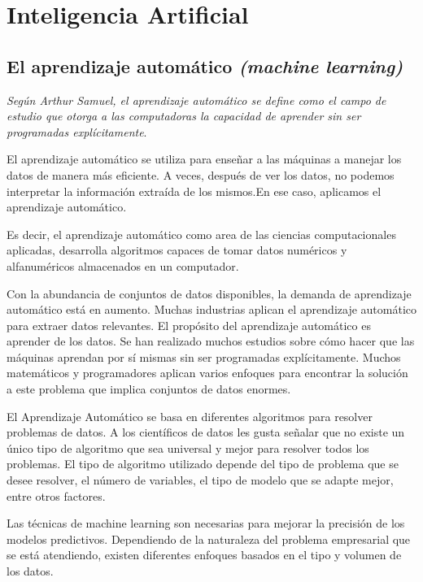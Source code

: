 \section{Inteligencia Artificial}
\subsection{El aprendizaje automático \textit{(machine learning)}}

\textit{Según Arthur Samuel, el aprendizaje automático se define como el campo de estudio que otorga a las computadoras la capacidad de aprender sin ser programadas explícitamente}\cite{mahesh2020machine}. 

El aprendizaje automático se utiliza para enseñar a las máquinas a manejar los datos de manera más eficiente. A veces, después de ver los datos, no podemos interpretar la información extraída de los mismos.En ese caso, aplicamos el aprendizaje automático.

Es decir, el aprendizaje automático como area de las ciencias computacionales aplicadas, desarrolla algoritmos capaces de tomar datos numéricos y alfanuméricos almacenados en un computador\cite{herrera2020prediccion}. 

Con la abundancia de conjuntos de datos disponibles, la demanda de aprendizaje automático está en aumento. Muchas industrias aplican el aprendizaje automático para extraer datos relevantes. El propósito del aprendizaje automático es aprender de los datos. Se han realizado muchos estudios sobre cómo hacer que las máquinas aprendan por sí mismas sin ser programadas explícitamente. Muchos matemáticos y programadores aplican varios enfoques para encontrar la solución a este problema que implica conjuntos de datos enormes\cite{mahesh2020machine}.

\vspace{1\baselineskip}
El Aprendizaje Automático se basa en diferentes algoritmos para resolver problemas de datos. A los científicos de datos les gusta señalar que no existe un único tipo de algoritmo que sea universal y mejor para resolver todos los problemas. El tipo de algoritmo utilizado depende del tipo de problema que se desee resolver, el número de variables, el tipo de modelo que se adapte mejor, entre otros factores. 

Las técnicas de machine learning son necesarias para mejorar la precisión de los modelos predictivos. Dependiendo de la naturaleza del problema empresarial que se está atendiendo, existen diferentes enfoques basados en el tipo y volumen de los datos\cite{ibm}.

